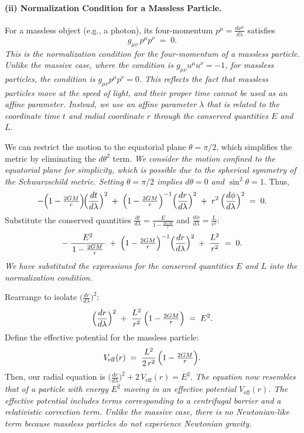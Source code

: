 \paragraph{(ii) Normalization Condition for a Massless Particle.}
For a massless object (e.g., a photon), its four-momentum \(p^\mu = \tfrac{dx^\mu}{d\lambda}\) satisfies
\begin{equation}
g_{\mu\nu}\,p^\mu p^\nu \;=\; 0.
\end{equation}
\textit{This is the normalization condition for the four-momentum of a massless particle. Unlike the massive case, where the condition is $g_{\mu\nu}u^\mu u^\nu = -1$, for massless particles, the condition is $g_{\mu\nu}p^\mu p^\nu = 0$. This reflects the fact that massless particles move at the speed of light, and their proper time cannot be used as an affine parameter. Instead, we use an affine parameter $\lambda$ that is related to the coordinate time $t$ and radial coordinate $r$ through the conserved quantities $E$ and $L$.}

We can restrict the motion to the equatorial plane \(\theta = \pi/2\), which simplifies the metric by eliminating the \(d\theta^2\) term. \textit{We consider the motion confined to the equatorial plane for simplicity, which is possible due to the spherical symmetry of the Schwarzschild metric. Setting $\theta = \pi/2$ implies $d\theta = 0$ and $\sin^2\theta = 1$}. Thus,
\begin{equation}
-\Bigl(1 - \tfrac{2GM}{r}\Bigr)\!\Bigl(\frac{dt}{d\lambda}\Bigr)^2
\;+\;
\Bigl(1 - \tfrac{2GM}{r}\Bigr)^{-1}
\Bigl(\frac{dr}{d\lambda}\Bigr)^2
\;+\;
r^2\,\Bigl(\frac{d\phi}{d\lambda}\Bigr)^2
\;=\;
0.
\end{equation}
Substitute the conserved quantities
\(\tfrac{dt}{d\lambda} = \tfrac{E}{1 - \tfrac{2GM}{r}}\) and \(\tfrac{d\phi}{d\lambda} = \tfrac{L}{r^2}\):
\begin{equation}
-\,
\frac{E^2}{\,1 - \tfrac{2GM}{r}\,}
\;+\;
\Bigl(1 - \tfrac{2GM}{r}\Bigr)^{-1}
\Bigl(\frac{dr}{d\lambda}\Bigr)^2
\;+\;
\frac{L^2}{r^2}
\;=\; 0.
\end{equation}
\textit{We have substituted the expressions for the conserved quantities $E$ and $L$ into the normalization condition.}

Rearrange to isolate \(\bigl(\tfrac{dr}{d\lambda}\bigr)^2\):
\begin{equation}
\Bigl(\frac{dr}{d\lambda}\Bigr)^2
\;+\;
\frac{L^2}{r^2}\,\Bigl(1 - \tfrac{2GM}{r}\Bigr)
\;=\;
E^2.
\end{equation}
Define the effective potential for the massless particle:
\begin{equation}
V_\mathrm{eff}(r)
\;=\;
\frac{L^2}{2\,r^2}\,\Bigl(1 - \tfrac{2GM}{r}\Bigr).
\end{equation}
Then, our radial equation is
\(
\bigl(\tfrac{dr}{d\lambda}\bigr)^2 + 2\,V_\mathrm{eff}(r) = E^2.
\)
\textit{The equation now resembles that of a particle with  energy  $E^2$ moving in an effective potential $V_{\text{eff}}(r)$. The effective potential includes terms corresponding to a centrifugal barrier and a relativistic correction term. Unlike the massive case, there is no Newtonian-like term because massless particles do not experience Newtonian gravity.}

